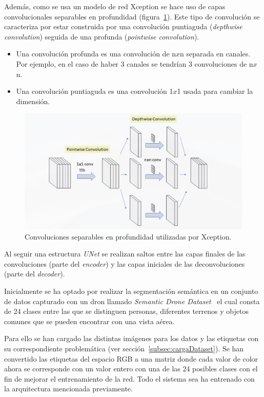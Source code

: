 \documentclass[a4paper]{article}
\begin{document}
Adem\'as, como se usa un modelo de red Xception se hace uso de capas convolucionales separables en profundidad (figura~\ref{fig:xception}).
Este tipo de convoluci\'on se caracteriza por estar construida por una convoluci\'on puntiaguda (\textit{depthwise convolution}) seguida de una profunda (\textit{pointwise convolution}).
\begin{itemize}
    \item Una convoluci\'on profunda es una convoluci\'on de n$x$n separada en canales. Por ejemplo, en el caso de haber 3 canales  se tendr\'ian 3 convoluciones de n$x$n.
    \item Una convoluci\'on puntiaguda es una convoluci\'on 1$x$1 usada para cambiar la dimensi\'on.
\end{itemize}

\begin{figure}[hbtp]
    \centering
    \includegraphics[scale=0.4]{img/xception.png}
    \caption{\small Convoluciones separables en profundidad utilizadas por Xception.}
    \label{fig:xception}
\end{figure}

Al seguir una estructura \textit{UNet} se realizan saltos entre las capas finales de las convoluciones (parte del \textit{encoder}) y las capas iniciales de las deconvoluciones (parte del \textit{decoder}).
\newline


Inicialmente se ha optado por realizar la segmentaci\'on sem\'antica en un conjunto de datos capturado con un dron llamado \textit{Semantic Drone Dataset}~\cite{droneDataset} el cual consta de 24 clases entre las que se distinguen personas, diferentes terrenos y objetos comunes que se pueden encontrar con una vista a\'erea.
\newline

Para ello se han cargado las distintas im\'agenes para los datos y las etiquetas con su correspondiente problem\'atica (ver secci\'on~\ref{subsec:cargaDataset}).
Se han convertido las etiquetas del espacio RGB a una matriz donde cada valor de color ahora se corresponde con un valor entero con una de las 24 posibles clases con el fin de mejorar el entrenamiento de la red.
Todo el sistema sea ha entrenado con la arquitectura mencionada previamente.
\newline
\end{document}
